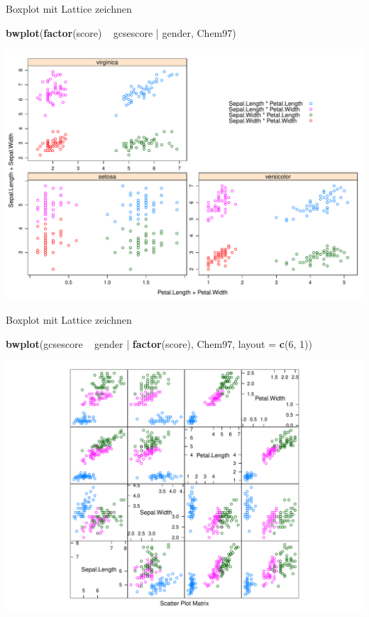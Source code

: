 \documentclass[ignorenonframetext,]{beamer}
\newenvironment{Shaded}{}{}
\newcommand{\KeywordTok}[1]{\textcolor[rgb]{0.00,0.44,0.13}{\textbf{{#1}}}}
\newcommand{\DataTypeTok}[1]{\textcolor[rgb]{0.56,0.13,0.00}{{#1}}}
\newcommand{\DecValTok}[1]{\textcolor[rgb]{0.25,0.63,0.44}{{#1}}}
\newcommand{\StringTok}[1]{\textcolor[rgb]{0.25,0.44,0.63}{{#1}}}
\newcommand{\NormalTok}[1]{{#1}}
\begin{document}
\begin{frame}[fragile]{Boxplot mit Lattice zeichnen}

\begin{Shaded}
\begin{Highlighting}[]
\KeywordTok{bwplot}\NormalTok{(}\KeywordTok{factor}\NormalTok{(score) ~}\StringTok{ }\NormalTok{gcsescore |}\StringTok{ }\NormalTok{gender, Chem97)}
\end{Highlighting}
\end{Shaded}

\includegraphics{R_intern_files/figure-beamer/unnamed-chunk-228-1.pdf}

\end{frame}

\begin{frame}[fragile]{Boxplot mit Lattice zeichnen}

\begin{Shaded}
\begin{Highlighting}[]
\KeywordTok{bwplot}\NormalTok{(gcsescore ~}\StringTok{ }\NormalTok{gender |}\StringTok{ }\KeywordTok{factor}\NormalTok{(score), Chem97,}
 \DataTypeTok{layout =} \KeywordTok{c}\NormalTok{(}\DecValTok{6}\NormalTok{, }\DecValTok{1}\NormalTok{))}
\end{Highlighting}
\end{Shaded}

\includegraphics{R_intern_files/figure-beamer/unnamed-chunk-229-1.pdf}

\end{frame}
\end{document}
